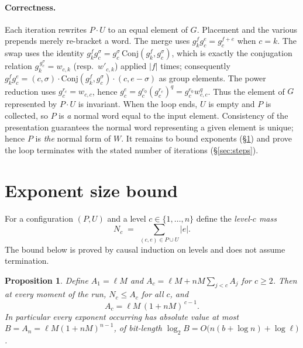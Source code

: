 \documentclass{amsart}
\newtheorem{proposition}{Proposition}
\theoremstyle{definition}
\begin{document}
\paragraph{Correctness.}
Each iteration rewrites $P\cdot U$ to an equal element of $G$. Placement and the various
prepends merely re-bracket a word. The merge uses $g_k^{f}g_c^{e}=g_c^{f+e}$ when $c=k$. The
swap uses the identity $g_k^{f}g_c^{\sigma}=g_c^{\sigma}\,\mathrm{Conj}(g_k^{f},g_c^{\sigma})$,
which is exactly the conjugation relation $g_k^{\,g_c^{\sigma}}=w_{c,k}$ (resp.\ $w'_{c,k}$)
applied $|f|$ times; consequently $g_k^{f}g_c^{e}=(c,\sigma)\cdot
\mathrm{Conj}(g_k^{f},g_c^{\sigma})\cdot(c,e-\sigma)$ as group elements. The power reduction
uses $g_c^{r_c}=w_{c,c}$, hence $g_c^{e}=g_c^{e_0}(g_c^{r_c})^{q}=g_c^{e_0}w_{c,c}^{q}$. Thus
the element of $G$ represented by $P\cdot U$ is invariant. When the loop ends, $U$ is empty and
$P$ is collected, so $P$ is \emph{a} normal word equal to the input element. Consistency of the
presentation guarantees the normal word representing a given element is unique; hence $P$ is
\emph{the} normal form of $W$. It remains to bound exponents (\S\ref{sec:exp}) and prove the
loop terminates with the stated number of iterations (\S\ref{sec:steps}).

\section{Exponent size bound}\label{sec:exp}

For a configuration $(P,U)$ and a level $c\in\{1,\dots,n\}$ define the \emph{level-$c$ mass}
\[
N_c\;=\;\sum_{(c,e)\in P\cup U}|e|.
\]
The bound below is proved by causal induction on levels and does not assume termination.

\begin{proposition}\label{prop:exp}
Define $A_1=\ell M$ and $A_c=\ell M+nM\sum_{j<c}A_j$ for $c\ge2$. Then at every moment of the
run, $N_c\le A_c$ for all $c$, and
\[
A_c=\ell M\,(1+nM)^{\,c-1}.
\]
In particular every exponent occurring has absolute value at most $B=A_n=\ell M(1+nM)^{n-1}$,
of bit-length $\log_2 B=O\!\bigl(n(b+\log n)+\log\ell\bigr)$.
\end{proposition}
\end{document}
